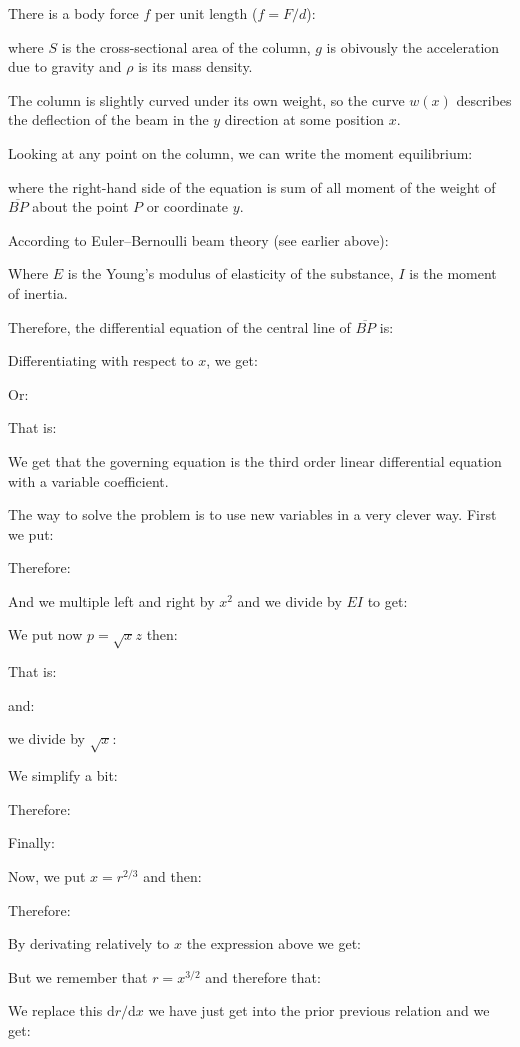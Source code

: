 	There is a body force $f$ per unit length ($f=F/d$):
	
	where $S$ is the cross-sectional area of the column, $g$ is obivously the acceleration due to gravity and $\rho$  is its mass density.

	The column is slightly curved under its own weight, so the curve $w(x)$ describes the deflection of the beam in the $y$ direction at some position $x$.
	
	Looking at any point on the column, we can write the moment equilibrium:
	
	where the right-hand side of the equation is sum of all moment of the weight of $\overline{BP}$ about the point $P$ or coordinate $y$.

	According to Euler–Bernoulli beam theory (see earlier above):
	
	Where $E$ is the Young's modulus of elasticity of the substance, $I$ is the moment of inertia.

	Therefore, the differential equation of the central line of $\overline{BP}$ is:
	
	Differentiating with respect to $x$, we get:
	
	Or:
	
	That is:
	
	We get that the governing equation is the third order linear differential equation with a variable coefficient. 
	
	The way to solve the problem is to use new variables in a very clever way. First we put:
	
	Therefore:
	
	And we multiple left and right by $x^2$ and we divide by $EI$ to get:
	
	We put now $p=\sqrt{x}z$ then:
	
	That is:
	
	and:
	
	we divide by $\sqrt{x}$:
	
	We simplify a bit:
	
	Therefore:
	
	Finally:
	
	Now, we put $x=r^{2/3}$ and then:
	
	Therefore:
	
	By derivating relatively to $x$ the expression above we get:
	
	But we remember that $r=x^{3/2}$ and therefore that:
	
	We replace this $\mathrm{d}r/\mathrm{d}x$ we have just get into the prior previous relation and we get:
	
